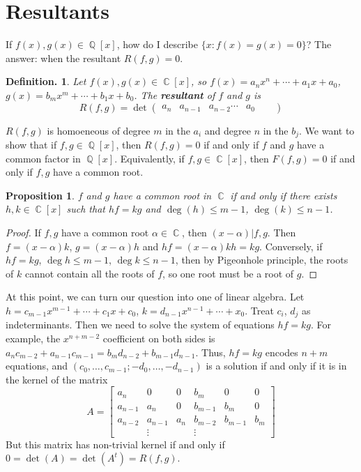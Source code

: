 \documentclass[11pt, a4paper]{memoir}
\DeclareMathOperator{\Q}{{\mathbb{Q}}}
\DeclareMathOperator{\C}{{\mathbb{C}}}
\theoremstyle{change}
\newtheorem{proposition}[theorem]{Proposition}
\theoremstyle{plain}
\theoremstyle{nonumberplain}
\newtheorem{definition}{Definition.}
\newtheorem{proof}{Proof}
\begin{document}
\section{Resultants}
If $f(x),g(x)\in\Q[x]$, how do I describe $\{x:f(x)=g(x)=0\}$?
The answer: when the resultant $R(f,g)=0$.
\begin{definition}
    Let $f(x),g(x)\in\C[x]$, so $f(x)=a_nx^n+\cdots+a_1x+a_0$, $g(x)=b_mx^m+\cdots+b_1x+b_0$.
    The \textbf{resultant} of $f$ and $g$ is
    \begin{equation*}
        R(f,g) =\det
        \begin{pmatrix}
            a_n&a_{n-1}&a_{n-2}\cdots&a_0&&
        \end{pmatrix}
    \end{equation*}
\end{definition}
$R(f,g)$ is homoeneous of degree $m$ in the $a_i$ and degree $n$ in the $b_j$.
We want to show that if $f,g\in\Q[x]$, then $R(f,g)=0$ if and only if $f$ and $g$ have a common factor in $\Q[x]$.
Equivalently, if $f,g\in\C[x]$, then $F(f,g)=0$ if and only if $f,g$ have a common root.
\begin{proposition}
    $f$ and $g$ have a common root in $\C$ if and only if there exists $h,k\in\C[x]$ such that $hf=kg$ and $\deg(h)\leq m-1$, $\deg(k)\leq n-1$.
\end{proposition}
\begin{proof}
    If $f,g$ have a common root $\alpha\in\C$, then $(x-\alpha)|f,g$.
    Then $f=(x-\alpha)k$, $g=(x-\alpha)h$ and $hf=(x-\alpha)kh=kg$.
    Conversely, if $hf=kg$, $\deg h\leq m-1$, $\deg k\leq n-1$, then by Pigeonhole principle, the roots of $k$ cannot contain all the roots of $f$, so one root must be a root of $g$.
\end{proof}
At this point, we can turn our question into one of linear algebra.
Let $h=c_{m-1}x^{m-1}+\cdots+c_1x+c_0$, $k=d_{n-1}x^{n-1}+\cdots+x_0$.
Treat $c_i$, $d_j$ as indeterminants.
Then we need to solve the system of equations $hf=kg$.
For example, the $x^{n+m-2}$ coefficient on both sides is $a_nc_{m-2}+a_{n-1}c_{m-1}=b_md_{n-2}+b_{m-1}d_{n-1}$.
Thus, $hf=kg$ encodes $n+m$ equations, and $(c_0,\ldots,c_{m-1};-d_0,\ldots,-d_{n-1})$ is a solution if and only if it is in the kernel of the matrix
\begin{equation*}
    A=
    \begin{bmatrix}
        a_n&0&0&b_m&0&0\\
        a_{n-1}&a_n&0&b_{m-1}&b_m&0\\
        a_{n-2}&a_{n-1}&a_n&b_{m-2}&b_{m-1}&b_m\\
               &\vdots&&\vdots&
    \end{bmatrix}
\end{equation*}
But this matrix has non-trivial kernel if and only if $0=\det(A)=\det(A^t)=R(f,g)$.
\end{document}
